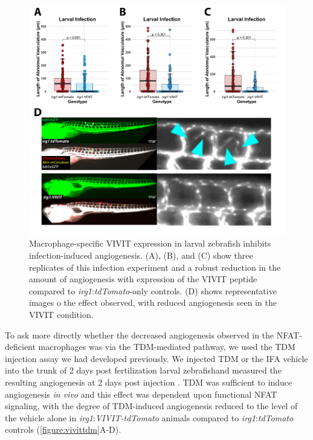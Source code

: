 \begin{figure}
\centering
\includegraphics[width=\textwidth]{images/vivitlinf.pdf}
\caption{Macrophage\hyp{}specific VIVIT expression in larval zebrafish inhibits infection\hyp{}induced angiogenesis. (A), (B), and (C) show three replicates of this infection experiment and a robust reduction in the amount of angiogenesis with expression of the VIVIT peptide compared to \textit{irg1}:\textit{tdTomato}\hyp{}only controls. (D) shows representative images o the effect observed, with reduced angiogenesis seen in the VIVIT condition.}
\label{figure:vivitinf}
\end{figure}

To ask more directly whether the decreased angiogenesis observed in the NFAT\hyp{}deficient macrophages was via the TDM\hyp{}mediated pathway, we used the TDM injection assay we had developed previously. We injected TDM or the IFA vehicle into the trunk of 2 days post fertilization larval zebrafishand measured the resulting angiogenesis at 2 days post injection \citep{Walton2018}. TDM was sufficient to induce angiogenesis \textit{in vivo} and this effect was dependent upon functional NFAT signaling, with the degree of TDM\hyp{}induced angiogenesis reduced to the level of the vehicle alone in \textit{irg1}:\textit{VIVIT\hyp{}tdTomato} animals compared to \textit{irg1}:\textit{tdTomato} controls (\autoref{figure:vivittdm}A\hyp{}D).

